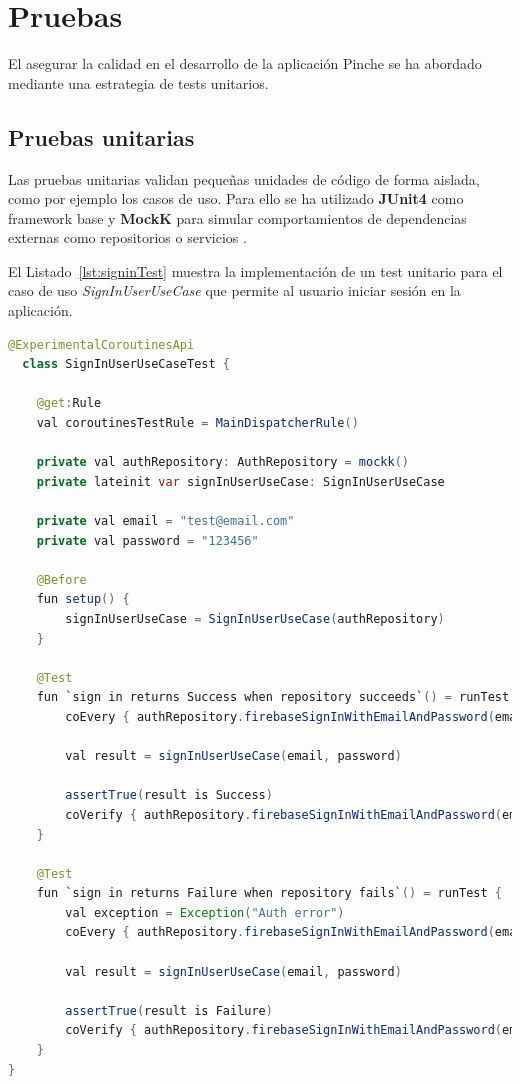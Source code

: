 \section{Pruebas}
\label{sec:pruebas}

El asegurar la calidad en el desarrollo de la aplicación Pinche se ha abordado mediante una estrategia de tests unitarios.

\subsection{Pruebas unitarias}

Las pruebas unitarias validan pequeñas unidades de código de forma aislada, como por ejemplo los casos de uso. Para ello se ha utilizado \textbf{JUnit4} como framework base y \textbf{MockK} para simular comportamientos de dependencias externas como repositorios o servicios \cite{android-testing}.

El Listado~\ref{lst:signinTest} muestra la implementación de un test unitario para el caso de uso \textit{SignInUserUseCase} que permite al usuario iniciar sesión en la aplicación.

\begin{lstlisting}[language=Java, caption={SignInUserUseCaseTest}, label={lst:signinTest}]
  @ExperimentalCoroutinesApi
  class SignInUserUseCaseTest {

    @get:Rule
    val coroutinesTestRule = MainDispatcherRule()

    private val authRepository: AuthRepository = mockk()
    private lateinit var signInUserUseCase: SignInUserUseCase

    private val email = "test@email.com"
    private val password = "123456"

    @Before
    fun setup() {
        signInUserUseCase = SignInUserUseCase(authRepository)
    }

    @Test
    fun `sign in returns Success when repository succeeds`() = runTest {
        coEvery { authRepository.firebaseSignInWithEmailAndPassword(email, password) } returns Success(true)

        val result = signInUserUseCase(email, password)

        assertTrue(result is Success)
        coVerify { authRepository.firebaseSignInWithEmailAndPassword(email, password) }
    }

    @Test
    fun `sign in returns Failure when repository fails`() = runTest {
        val exception = Exception("Auth error")
        coEvery { authRepository.firebaseSignInWithEmailAndPassword(email, password) } returns Failure(exception)

        val result = signInUserUseCase(email, password)

        assertTrue(result is Failure)
        coVerify { authRepository.firebaseSignInWithEmailAndPassword(email, password) }
    }
}
\end{lstlisting}